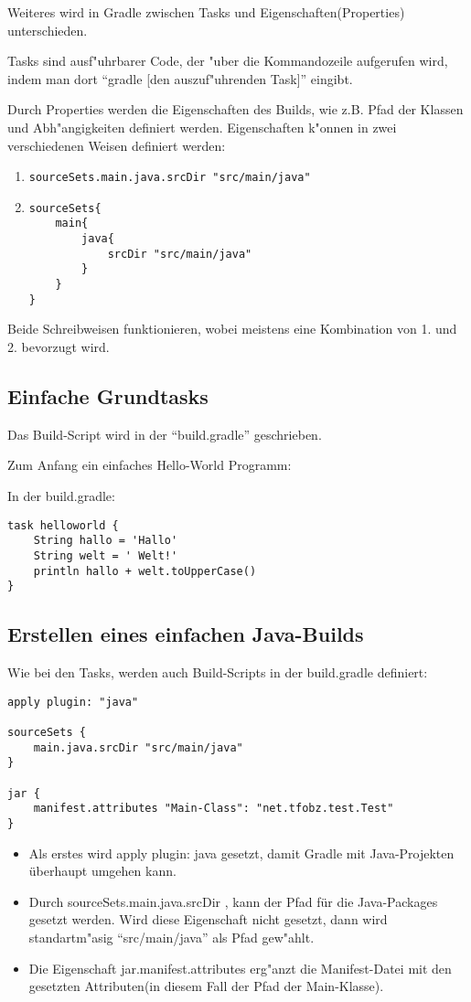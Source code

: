 Weiteres wird in Gradle zwischen Tasks und Eigenschaften(Properties) unterschieden.

Tasks sind ausf"uhrbarer Code, der "uber die Kommandozeile aufgerufen wird, indem man dort ``gradle [den auszuf"uhrenden Task]'' eingibt.

Durch Properties werden die Eigenschaften des Builds, wie z.B. Pfad der Klassen und Abh"angigkeiten definiert werden. Eigenschaften k"onnen in zwei verschiedenen Weisen definiert werden:
\begin{enumerate}
\item \begin{verbatim}
sourceSets.main.java.srcDir "src/main/java"
\end{verbatim}
\item \begin{verbatim}
sourceSets{
    main{
        java{
            srcDir "src/main/java"
        }
    }
}
\end{verbatim}
\end{enumerate}
Beide Schreibweisen funktionieren, wobei meistens eine Kombination von 1. und 2. bevorzugt wird.
\subsection{Einfache Grundtasks}
Das Build-Script wird in der ``build.gradle'' geschrieben.

Zum Anfang ein einfaches Hello-World Programm:

In der build.gradle:

\begin{verbatim}
task helloworld {
    String hallo = 'Hallo'
    String welt = ' Welt!'
    println hallo + welt.toUpperCase()
}
\end{verbatim}

\subsection{Erstellen eines einfachen Java-Builds}
Wie bei den Tasks, werden auch Build-Scripts in der build.gradle definiert:

\begin{verbatim}
apply plugin: "java"

sourceSets {
    main.java.srcDir "src/main/java"
}

jar {
    manifest.attributes "Main-Class": "net.tfobz.test.Test"
}
\end{verbatim}
\begin{itemize}
\item Als erstes wird apply plugin: java gesetzt, damit Gradle mit Java-Projekten überhaupt umgehen kann.
\item Durch sourceSets.main.java.srcDir , kann der Pfad für die Java-Packages gesetzt werden. Wird diese Eigenschaft nicht gesetzt, dann wird standartm"asig ``src/main/java'' als Pfad gew"ahlt.
\item Die Eigenschaft jar.manifest.attributes erg"anzt die Manifest-Datei mit den gesetzten Attributen(in diesem Fall der Pfad der Main-Klasse).
\end{itemize}
